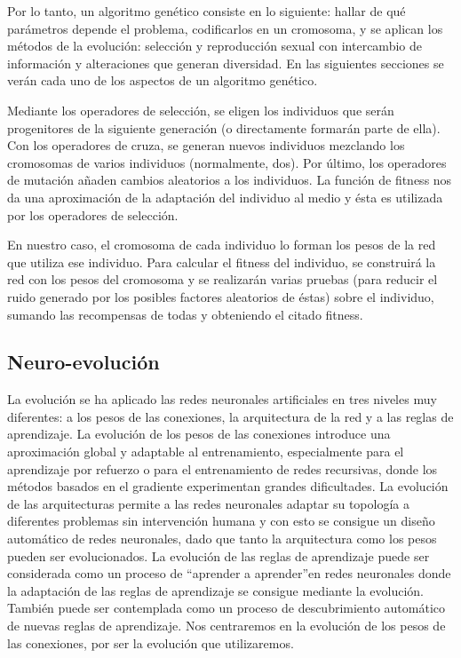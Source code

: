 \documentclass[11pt]{article}
\begin{document}
\begin{titlepage}
 Por lo tanto, un algoritmo gen\'etico consiste en lo siguiente: hallar de qu\'e par\'ametros depende el problema, codificarlos en un cromosoma, y se aplican los m\'etodos de la evoluci\'on: selecci\'on y reproducci\'on sexual con intercambio de informaci\'on y alteraciones que generan diversidad. En las siguientes secciones se ver\'an cada uno de los aspectos de un algoritmo gen\'etico.

 Mediante los operadores de selecci\'on, se eligen los individuos que ser\'an progenitores de la siguiente generaci\'on (o directamente formar\'an parte de ella). Con los operadores de cruza, se generan nuevos individuos mezclando los cromosomas de varios individuos (normalmente, dos). Por \'ultimo, los operadores de mutaci\'on a\~naden cambios aleatorios a los individuos. La funci\'on de fitness nos da una aproximaci\'on de la adaptaci\'on del individuo al medio y \'esta es utilizada por los operadores de selecci\'on.

 En nuestro caso, el cromosoma de cada individuo lo forman los pesos de la red que utiliza ese individuo. Para calcular el fitness del individuo, se construir\'a la red con los pesos del cromosoma y se realizar\'an varias pruebas (para reducir el ruido generado por los posibles factores aleatorios de \'estas) sobre el individuo, sumando las recompensas de todas y obteniendo el citado fitness.
\subsection{Neuro-evoluci\'on}
\label{sec-2-3}

  \label{basTeoNeuro}

 La evoluci\'on se ha aplicado las redes neuronales artificiales en tres niveles muy diferentes: a los pesos de las conexiones, la arquitectura de la red y a las reglas de aprendizaje. La evoluci\'on de los pesos de las conexiones introduce una aproximaci\'on global y adaptable al entrenamiento, especialmente para el aprendizaje por refuerzo o para el entrenamiento de redes recursivas, donde los m\'etodos basados en el gradiente experimentan grandes dificultades. La evoluci\'on de las arquitecturas permite a las redes neuronales adaptar su topolog\'ia a diferentes problemas sin intervenci\'on humana y con esto se consigue un dise\~no autom\'atico de redes neuronales, dado que tanto la arquitectura como los pesos pueden ser evolucionados. La evoluci\'on de las reglas de aprendizaje puede ser considerada como un proceso de \textquotedblleft aprender a aprender\textquotedblright en redes neuronales donde la adaptaci\'on de las reglas de aprendizaje se consigue mediante la evoluci\'on. Tambi\'en puede ser contemplada como un proceso de descubrimiento autom\'atico de nuevas reglas de aprendizaje. Nos centraremos en la evoluci\'on de los pesos de las conexiones, por ser la evoluci\'on que utilizaremos.


\end{titlepage}
\end{document}
